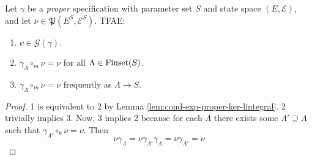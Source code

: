 \begin{lemma}
    \label{lem:gibbs-meas-tfae}
    \leanok

    Let $\gamma$ be a {\it proper} specification with parameter set $S$ and state space $(E, \mathcal{E})$, and let $\nu\in\mathfrak{P}(E^S, \mathcal{E}^S)$. TFAE:
    \begin{enumerate}
        \item $\nu\in\mathcal{G}(\gamma)$.
        \item $\gamma_\Lambda\circ_m\nu = \nu$ for all $\Lambda\in\operatorname{Finset}(S)$.
        \item $\gamma_\Lambda\circ_m\nu = \nu$ frequently as $\Lambda \to S$.
    \end{enumerate}
\end{lemma}
\begin{proof}
    \leanok

    1 is equivalent to 2 by Lemma \ref{lem:cond-exp-proper-ker-lintegral}. 2 trivially implies 3. Now, 3 implies 2 because for each $\Lambda$ there exists some $\Lambda' \supseteq \Lambda$ such that
    $\gamma_{\Lambda'}\circ_k\nu = \nu$. Then
    $$\nu\gamma_\Lambda = \nu\gamma_{\Lambda'}\gamma_\Lambda = \nu\gamma_{\Lambda'} = \nu$$
\end{proof}
